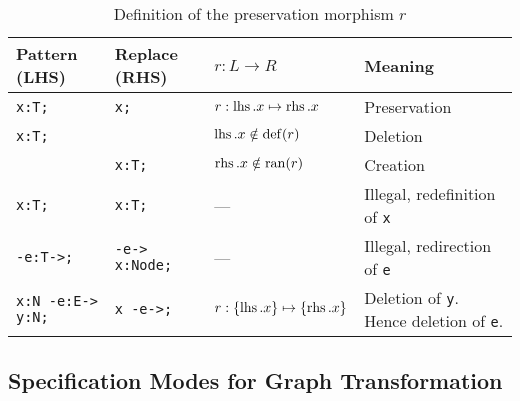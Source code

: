\begin{table}[htbp]
\centering
\begin{tabularx}{\linewidth}{lllX}
  \textbf{Pattern (LHS)} & \textbf{Replace (RHS)} & \textbf{$r: L \longrightarrow R$} & \textbf{Meaning} \\ \hline 
  \texttt{x:T;} & \texttt{x;}                 & $r:\operatorname{lhs}.x \mapsto \operatorname{rhs}.x$ & Preservation \\
  \texttt{x:T;} & \texttt{}                   & $\operatorname{lhs}.x \notin \operatorname{def}(r)$    & Deletion \\
  \texttt{} & \texttt{x:T;}                   & $\operatorname{rhs}.x \notin \operatorname{ran}(r)$    & Creation \\
  \texttt{x:T;} & \texttt{x:T;}               & --- & Illegal, redefinition of \texttt{x} \\
  \texttt{-e:T->;} & \texttt{-e-> x:Node;}    & --- & Illegal, redirection of  \texttt{e} \\
  \texttt{x:N -e:E-> y:N;} & \texttt{x -e->;} & $r:\{\operatorname{lhs}.x\} \mapsto \{\operatorname{rhs}.x\}$ & Deletion of \texttt{y}. Hence del\-etion of \texttt{e}. \\
\end{tabularx}
\caption{Definition of the preservation morphism $r$}
\label{rule:impldefinition}
\end{table}

\subsection{Specification Modes for Graph Transformation}

